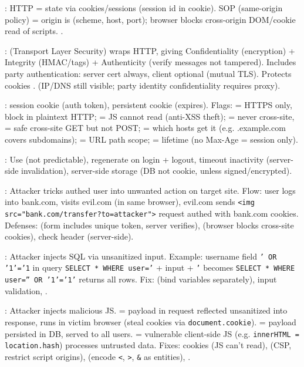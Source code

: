 
: HTTP =  \to state via cookies/sessions (session id in cookie). SOP (same-origin policy) = origin is (scheme, host, port); browser blocks cross-origin DOM/cookie read of scripts. .

:  (Transport Layer Security) wraps HTTP, giving Confidentiality (encryption) + Integrity (HMAC/tags) + Authenticity (verify messages not tampered). Includes party authentication: server cert always, client optional (mutual TLS). Protects cookies .  (IP/DNS still visible; party identity confidentiality requires proxy).

: session cookie (auth token), persistent cookie (expires). Flags:  = HTTPS only, block in plaintext HTTP;  = JS cannot read (anti-XSS theft);  = never cross-site,  = safe cross-site GET but not POST;  = which hosts get it (e.g. .example.com covers subdomains);  = URL path scope;  = lifetime (no Max-Age = session only).

: Use  (not predictable), regenerate on login + logout, timeout inactivity (server-side invalidation), server-side storage (DB not cookie, unless signed/encrypted). 

: Attacker tricks authed user into unwanted action on target site. Flow: user logs into bank.com, visits evil.com (in same browser), evil.com sends \texttt{<img src="bank.com/transfer?to=attacker">} \to request authed with bank.com cookies. Defenses:  (form includes unique token, server verifies),  (browser blocks cross-site cookies), check  header (server-side).

: Attacker injects SQL via unsanitized input. Example: username field \texttt{' OR '1'='1} in query \texttt{SELECT * WHERE user='} + input + \texttt{'} becomes \texttt{SELECT * WHERE user='' OR '1'='1'} \to returns all rows. Fix:  (bind variables separately), input validation, .

: Attacker injects malicious JS.  = payload in request reflected unsanitized into response, runs in victim browser (steal cookies via \texttt{document.cookie}).  = payload persisted in DB, served to all users.  = vulnerable client-side JS (e.g. \texttt{innerHTML = location.hash}) processes untrusted data. Fixes:  cookies (JS can't read),  (CSP, restrict script origins),  (encode \texttt{<}, \texttt{>}, \texttt{\&} as entities), .

